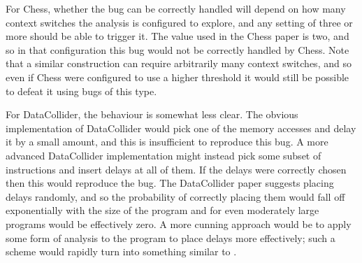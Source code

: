 For Chess, whether the bug can be correctly handled will depend on how
many context switches the analysis is configured to explore, and any
setting of three or more should be able to trigger it.  The value used
in the Chess paper is two, and so in that configuration this bug would
not be correctly handled by Chess.  Note that a similar construction
can require arbitrarily many context switches, and so even if Chess
were configured to use a higher threshold it would still be possible
to defeat it using bugs of this type.

For DataCollider, the behaviour is somewhat less clear.  The obvious
implementation of DataCollider would pick one of the memory accesses
and delay it by a small amount, and this is insufficient to reproduce
this bug.  A more advanced DataCollider implementation might instead
pick some subset of instructions and insert delays at all of them.  If
the delays were correctly chosen then this would reproduce the bug.
The DataCollider paper suggests placing delays randomly, and so the
probability of correctly placing them would fall off exponentially
with the size of the program and for even moderately large programs
would be effectively zero.  A more cunning approach would be to apply
some form of analysis to the program to place delays more effectively;
such a scheme would rapidly turn into something similar to
{\technique}.


